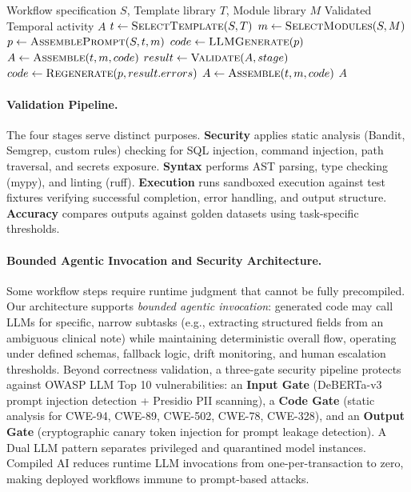 \documentclass[11pt]{article}
\begin{document}
\begin{algorithm}[ht]
\caption{Code Foundry Generation Process}
\label{alg:generation}
\begin{algorithmic}[1]
\Require Workflow specification $S$, Template library $T$, Module library $M$
\Ensure Validated Temporal activity $A$
\State $t \gets \textsc{SelectTemplate}(S, T)$
\State $m \gets \textsc{SelectModules}(S, M)$
\State $p \gets \textsc{AssemblePrompt}(S, t, m)$
\State $code \gets \textsc{LLMGenerate}(p)$ 
\State $A \gets \textsc{Assemble}(t, m, code)$
    \State $result \gets \textsc{Validate}(A, stage)$
        \State $code \gets \textsc{Regenerate}(p, result.errors)$
        \State $A \gets \textsc{Assemble}(t, m, code)$
    \EndIf
\EndFor
\State \Return $A$ 
\end{algorithmic}
\end{algorithm}

\paragraph{Validation Pipeline.} The four stages serve distinct purposes. \textbf{Security} applies static analysis (Bandit, Semgrep, custom rules) checking for SQL injection, command injection, path traversal, and secrets exposure. \textbf{Syntax} performs AST parsing, type checking (mypy), and linting (ruff). \textbf{Execution} runs sandboxed execution against test fixtures verifying successful completion, error handling, and output structure. \textbf{Accuracy} compares outputs against golden datasets using task-specific thresholds.

\paragraph{Bounded Agentic Invocation and Security Architecture.} Some workflow steps require runtime judgment that cannot be fully precompiled. Our architecture supports \textit{bounded agentic invocation}: generated code may call LLMs for specific, narrow subtasks (e.g., extracting structured fields from an ambiguous clinical note) while maintaining deterministic overall flow, operating under defined schemas, fallback logic, drift monitoring, and human escalation thresholds. Beyond correctness validation, a three-gate security pipeline protects against OWASP LLM Top 10 vulnerabilities: an \textbf{Input Gate} (DeBERTa-v3 prompt injection detection + Presidio PII scanning), a \textbf{Code Gate} (static analysis for CWE-94, CWE-89, CWE-502, CWE-78, CWE-328), and an \textbf{Output Gate} (cryptographic canary token injection for prompt leakage detection). A Dual LLM pattern separates privileged and quarantined model instances. Compiled AI reduces runtime LLM invocations from one-per-transaction to zero, making deployed workflows immune to prompt-based attacks.
\end{document}
